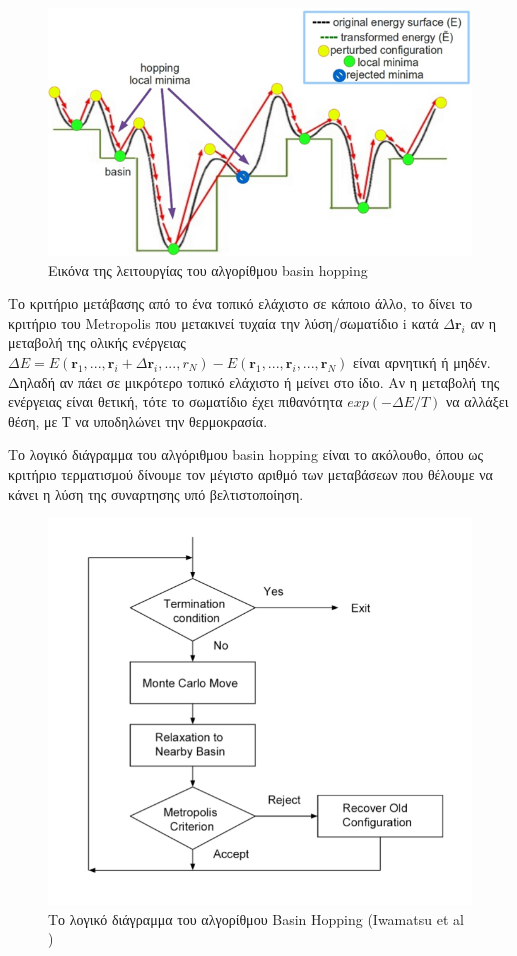 \documentclass[a4paper,12pt,twoside]{report}
\theoremstyle{plain}
\theoremstyle{definition}
\theoremstyle{remark}
\begin{document}
\begin{figure}[h]
	\centering
	\includegraphics[scale=0.7]{basin-hoping2}
    \caption{Εικόνα της λειτουργίας του αλγορίθμου basin hopping \cite{Hashmi_2013}}
\end{figure}

Το κριτήριο μετάβασης από το ένα τοπικό ελάχιστο σε κάποιο άλλο, το δίνει το κριτήριο του Metropolis \cite{Wille_1987} που μετακινεί τυχαία την λύση/σωματίδιο i κατά $\Delta \textbf{r}_i$ αν η μεταβολή της ολικής ενέργειας  $\Delta E = E(\textbf{r}_1,...,\textbf{r}_i + \Delta\textbf{r}_i,...,r_N) - E(\textbf{r}_1,...,\textbf{r}_i,...,\textbf{r}_N)$ είναι αρνητική ή μηδέν. Δηλαδή αν πάει σε μικρότερο τοπικό ελάχιστο ή μείνει στο ίδιο. Αν η μεταβολή της ενέργειας είναι θετική, τότε το σωματίδιο έχει πιθανότητα $exp(-\Delta E/T)$ να αλλάξει θέση, με Т να υποδηλώνει την θερμοκρασία.  

Το λογικό διάγραμμα του αλγόριθμου basin hopping είναι το ακόλουθο, όπου ως κριτήριο τερματισμού δίνουμε τον μέγιστο αριθμό των μεταβάσεων που θέλουμε να κάνει η λύση της συναρτησης υπό βελτιστοποίηση.

\begin{figure}[h]
	\centering
	\includegraphics[scale=0.7]{hbasinflow}
    \caption{Το λογικό διάγραμμα του αλγορίθμου Basin Hopping (Iwamatsu et al \cite{Iwamatsu_2004})}
\end{figure}
\end{document}
